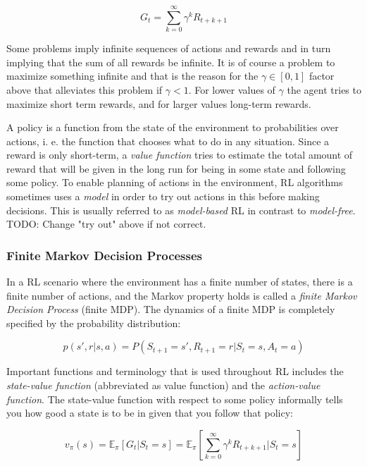 \begin{equation}
    G_t = \sum_{k=0}^\infty \gamma^k R_{t+k+1}
\end{equation}

Some problems imply infinite sequences of actions and rewards and in turn
implying that the sum of all rewards be infinite. It is of course a problem to
maximize something infinite and that is the reason for the $\gamma \in \left[0, 1\right]$ factor above
that alleviates this problem if $\gamma < 1$. For lower values of $\gamma$ the agent
tries to maximize short term rewards, and for larger values long-term rewards. 

A policy is a function from the state of the environment to probabilities over
actions, i. e.  the function that chooses what to do in any situation. Since a
reward is only short-term, a \textit{value function} tries to estimate the
total amount of reward that will be given in the long run for being in some
state and following some policy. To enable planning of actions in the
environment, RL algorithms sometimes uses a \textit{model} in order to try out
actions in this before making decisions. This is usually referred to as
\textit{model-based} RL in contrast to \textit{model-free}. TODO: Change "try
out" above if not correct.

\subsubsection{Finite Markov Decision Processes}

In a RL scenario where the environment has a finite number of states, there is
a finite number of actions, and the Markov property holds is called a
\textit{finite Markov Decision Process} (finite MDP). The dynamics of a finite MDP is completely specified by the
probability distribution:

\begin{equation}
    p(s', r|s, a) = P(S_{t+1} = s', R_{t+1} = r | S_t = s, A_t = a)
\end{equation}

Important functions and terminology that is used throughout RL includes the \textit{state-value function} (abbreviated as value function) and
the \textit{action-value function}. The state-value function with respect to some policy informally tells you
how good a state is to be in given that you follow that policy:

\begin{equation}
    v_\pi(s) = \mathbb{E}_\pi\left[G_t|S_t=s\right] = \mathbb{E}_\pi\left[\sum_{k=0}^\infty \gamma^k R_{t+k+1}|S_t=s\right]
\end{equation}

